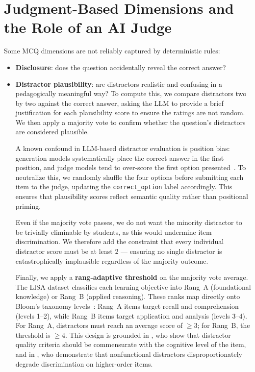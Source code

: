 \documentclass[11pt]{article}
\begin{document}
\section{Judgment-Based Dimensions and the Role of an AI Judge}
Some MCQ dimensions are not reliably captured by deterministic rules:
\begin{itemize}[leftmargin=*]
  \item \textbf{Disclosure}: does the question accidentally reveal the correct answer?
  \item \textbf{Distractor plausibility}: are distractors realistic and confusing in a pedagogically meaningful way? To compute this, we compare distractors two by two against the correct answer, asking the LLM to provide a brief justification for each plausibility score to ensure the ratings are not random. We then apply a majority vote to confirm whether the question's distractors are considered plausible.

  A known confound in LLM-based distractor evaluation is position bias: generation models systematically place the correct answer in the first position, and judge models tend to over-score the first option presented~\cite{zheng2023judging}. To neutralize this, we randomly shuffle the four options before submitting each item to the judge, updating the \texttt{correct\_option} label accordingly. This ensures that plausibility scores reflect semantic quality rather than positional priming.

  Even if the majority vote passes, we do not want the minority distractor to be trivially eliminable by students, as this would undermine item discrimination. We therefore add the constraint that every individual distractor score must be at least 2 --- ensuring no single distractor is catastrophically implausible regardless of the majority outcome.

  Finally, we apply a \textbf{rang-adaptive threshold} on the majority vote average. The LISA dataset classifies each learning objective into Rang~A (foundational knowledge) or Rang~B (applied reasoning). These ranks map directly onto Bloom's taxonomy levels~\cite{anderson2001taxonomy}: Rang~A items target recall and comprehension (levels 1--2), while Rang~B items target application and analysis (levels 3--4). For Rang~A, distractors must reach an average score of $\geq 3$; for Rang~B, the threshold is $\geq 4$. This design is grounded in \citet{haladyna2013developing}, who show that distractor quality criteria should be commensurate with the cognitive level of the item, and in \citet{gierl2017developing}, who demonstrate that nonfunctional distractors disproportionately degrade discrimination on higher-order items.


\end{itemize}
\end{document}
